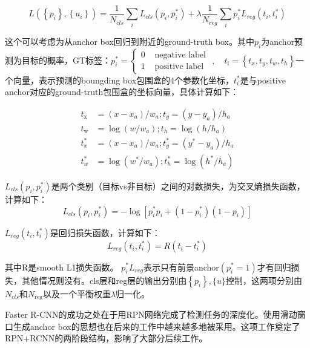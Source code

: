 \begin{itemize}
\begin{equation}
	L\left(\left\{p_{i}\right\},\left\{u_{i}\right\}\right)=\frac{1}{N_{c l s}} \sum_{i} L_{cls}\left(p_{i}, p_{i}^{*}\right)+\lambda \frac{1}{N_{r e g}} \sum_{i} p_{i}^{*} L_{r e g}\left(t_{i}, t_{i}^{*}\right)
\end{equation}

这个可以考虑为从anchor box回归到附近的ground-truth box。其中$p_i$为anchor预测为目标的概率，GT标签：$p_{i}^{*}=\left\{\begin{array}{ll}{0} & {\text { negative label }} \\ {1} & {\text { positive label }}\end{array}\right., \quad t_{\mathrm{i}}=\left\{t_{x}, t_{y}, t_{w}, t_{h}\right\}$一个向量，表示预测的boungding box包围盒的4个参数化坐标，$t_{i}^{*}$是与positive anchor对应的ground-truth包围盒的坐标向量，具体计算如下：

\begin{equation}
	\begin{aligned} t_{\mathrm{x}} &=\left(x-x_{a}\right) / w_{a} ; t_{y}=\left(y-y_{a}\right) / h_{a} \\ t_{\mathrm{w}} &=\log \left(w / w_{a}\right) ; t_{h}=\log \left(h / h_{a}\right) \\ t_{x}^{*} &=\left(x-x_{a}\right) / w_{a} ; t_{y}^{*}=\left(y^{*}-y_{a}\right) / h_{a} \\ t_{w}^{*} &=\log \left(w^{*} / w_{a}\right) ; t_{h}^{*}=\log \left(h^{*} / h_{a}\right) \end{aligned}
\end{equation}

$L_{c l s}\left(p_{i}, p_{i}^{*}\right)$是两个类别（目标vs非目标）之间的对数损失，为交叉熵损失函数，计算如下：
\begin{equation}
	L_{c l s}\left(p_{i}, p_{i}^{*}\right)=-\log \left[p_{i}^{*} p_{i}+\left(1-p_{i}^{*}\right)\left(1-p_{i}\right)\right]
\end{equation}

$L_{r e g}\left(t_{i}, t_{i}^{*}\right)$是回归损失函数，计算如下：
\begin{equation}
	L_{r e g}\left(t_{i}, t_{i}^{*}\right)=R\left(t_{i}-t_{i}^{*}\right)
\end{equation}

其中R是smooth L1损失函数。
$p_{i}^{*} L_{r e g}$表示只有前景anchor$\left(p_{i}^{*}=1\right)$才有回归损失，其他情况则没有。cls层和reg层的输出分别由$\left\{p_{i}\right\},\{u\}$控制，这两项分别由$N_{c l s}$和$N_{\text {reg}}$以及一个平衡权重$\lambda$归一化。

Faster R-CNN的成功之处在于用RPN网络完成了检测任务的深度化。使用滑动窗口生成anchor box的思想也在后来的工作中越来越多地被采用。这项工作奠定了RPN+RCNN的两阶段结构，影响了大部分后续工作。

\end{itemize}

